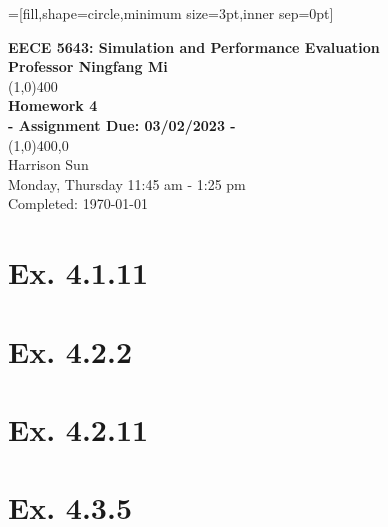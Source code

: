 \documentclass[11]{article}
\begin{document}
=[fill,shape=circle,minimum size=3pt,inner sep=0pt]

\begin{titlepage}
\begin{center}
\vspace*{2cm}
\Large{\textbf{EECE 5643: Simulation and Performance Evaluation}}\\
\Large{\textbf{Professor Ningfang Mi}}\\
\vfill
\line(1,0){400}\\[1mm]
\huge{\textbf{Homework 4}}\\[3mm]
\Large{\textbf{- Assignment Due: 03/02/2023 -}}\\[1mm]
\line(1,0){400,0}\\
\vfill
Harrison Sun\\
Monday, Thursday 11:45 am - 1:25 pm \\
Completed: \today\
\end{center}
\end{titlepage}

\section{\textbf{Ex. 4.1.11}}

\pagebreak

\section{\textbf{Ex. 4.2.2}}

\pagebreak

\section{\textbf{Ex. 4.2.11}}

\pagebreak

\section{\textbf{Ex. 4.3.5}}

\newpage
\end{document}
